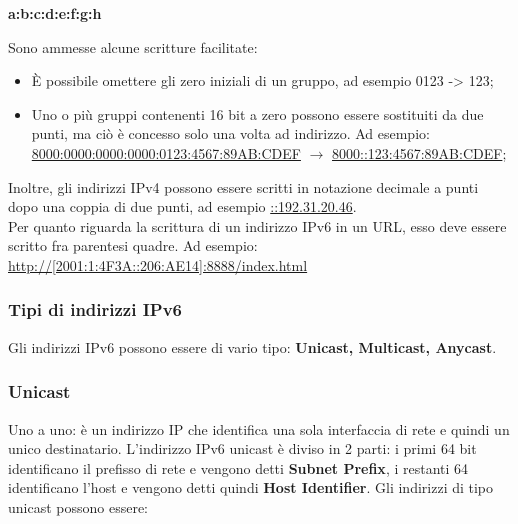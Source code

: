             \begin{center}
                \textbf{a:b:c:d:e:f:g:h}
            \end{center}

            Sono ammesse alcune scritture facilitate:

            \begin{itemize}
                \item È possibile omettere gli zero iniziali di un gruppo, ad esempio 0123 -> 123;
                \item Uno o più gruppi contenenti 16 bit a zero possono essere sostituiti da due punti, ma ciò
                è concesso solo una volta ad indirizzo. Ad esempio:
                \underline{8000:0000:0000:0000:0123:4567:89AB:CDEF} $\rightarrow$ \underline{8000::123:4567:89AB:CDEF};
            \end{itemize}

            Inoltre, gli indirizzi IPv4 possono essere scritti in notazione decimale a punti dopo una coppia
            di due punti, ad esempio \underline{::192.31.20.46}.\\

            Per quanto riguarda la scrittura di un indirizzo IPv6 in un URL, esso deve essere scritto fra
            parentesi quadre. Ad esempio: \url{http://[2001:1:4F3A::206:AE14]:8888/index.html}
            
        \subsubsection*{Tipi di indirizzi IPv6}
            Gli indirizzi IPv6 possono essere di vario tipo: \textbf{Unicast, Multicast, Anycast}.
            
        \subsubsection*{Unicast}
            Uno a uno: è un indirizzo IP che identifica una sola interfaccia di rete e quindi un unico
            destinatario. L’indirizzo IPv6 unicast è diviso in 2 parti: i primi 64 bit identificano il prefisso di
            rete e vengono detti \textbf{Subnet Prefix}, i restanti 64 identificano l’host e vengono detti quindi \textbf{Host
            Identifier}. Gli indirizzi di tipo unicast possono essere:


